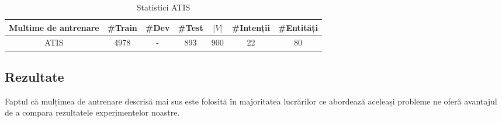 \begin{table}
	\centering
	\caption{Statistici ATIS}
	\label{atis_stats}
	\begin{adjustbox}{max width=\textwidth}
		\begin{tabular}{ |c|c|c|c|c|c|c| } 
			\hline
			\textbf{Multime de antrenare} & \#Train & \#Dev & \#Test & $|V|$ & \#Intenții & \#Entități \\ 
			\hline
			ATIS & 4978 & - & 893 & 900 & 22 & 80 \\
			\hline
		\end{tabular}
	\end{adjustbox}
\end{table}


\subsection{Rezultate}
Faptul că mulțimea de antrenare descrisă mai sus este folosită în majoritatea lucrărilor ce abordează aceleași probleme ne oferă avantajul de a compara rezultatele experimentelor noastre.

